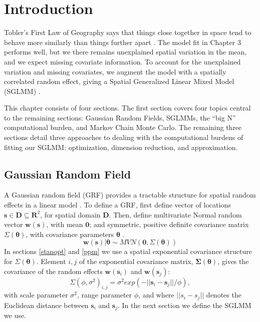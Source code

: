 
\section{Introduction} %

Tobler's First Law of Geography says that things close together in space tend to behave more similarly than things further apart \citep{Tobler1970}. The model fit in Chapter 3 performs well, but we there remains unexplained spatial variation in the mean, and we expect missing covariate information. To account for the unexplained variation and missing covariates, we augment the model with a spatially correlated random effect, giving a Spatial Generalized Linear Mixed Model (SGLMM) \citep{Banerjee2008}.

This chapter consists of four sections. The first section covers four topics central to the remaining sections: Gaussian Random Fields, SGLMMs, the ``big N'' computational burden, and Markov Chain Monte Carlo. The remaining three sections detail three approaches to dealing with the computational burdens of fitting our SGLMM: optimization, dimension reduction, and approximation.

\subsection{Gaussian Random Field} %

A Gaussian random field (GRF) provides a tractable structure for spatial random effects in a linear model \citep{Gelfand2010}. To define a GRF, first define vector of locations $\pmb{s} \in \pmb{D} \subseteq \pmb{R}^{2}$, for spatial domain $\pmb{D}$. Then, define multivariate Normal random vector $\pmb{w}(\pmb{s})$, with mean $\pmb{0}$; and symmetric, positive definite covariance matrix $\Sigma(\pmb{\theta})$, with covariance parameters $\pmb{\theta}$ \citep{Haran2011}.
\begin{equation} \label{eq:w}
\pmb{w}(\pmb{s}) | \pmb{\theta} \sim MVN(\pmb{0}, \Sigma(\pmb{\theta})) 
\end{equation}
In sections \ref{stanopt} and \ref{ppm} we use a spatial exponential covariance structure for $\Sigma(\pmb{\theta})$. Element $i,j$ of the exponential covariance matrix, $\pmb{\Sigma}(\pmb{\theta})$, gives the covariance of the random effects $\pmb{w}(\pmb{s}_{i})$ and $\pmb{w}(\pmb{s}_{j})$:
\begin{equation} \label{eq:exp}
\Sigma(\phi, \sigma^{2})_{i,j} = \sigma^{2} exp(-||\pmb{s}_{i} - \pmb{s}_{j}||/\phi),
\end{equation}
with scale parameter $\sigma^{2}$, range parameter $\phi$, and where $||s_{i} - s_{j}||$ denotes the Euclidean distance between $\pmb{s}_{i}$ and $\pmb{s}_{j}$. In the next section we define the SGLMM we use.

